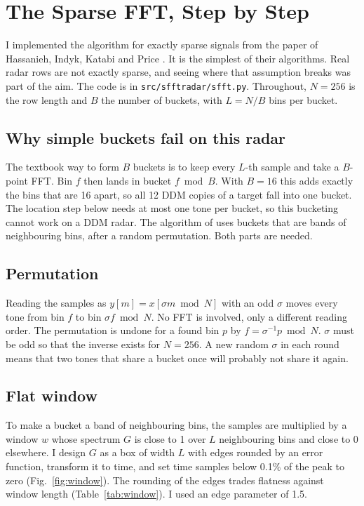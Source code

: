 \documentclass[10pt,a4paper]{article}
\begin{document}
\section{The Sparse FFT, Step by Step}
I implemented the algorithm for exactly sparse signals from the paper of Hassanieh, Indyk, Katabi and Price \cite{hassanieh2012nearly}. It is the simplest of their algorithms. Real radar rows are not exactly sparse, and seeing where that assumption breaks was part of the aim. The code is in \texttt{src/sfftradar/sfft.py}. Throughout, $N = 256$ is the row length and $B$ the number of buckets, with $L = N/B$ bins per bucket.

\subsection{Why simple buckets fail on this radar}
The textbook way to form $B$ buckets is to keep every $L$-th sample and take a $B$-point FFT. Bin $f$ then lands in bucket $f \bmod B$. With $B = 16$ this adds exactly the bins that are 16 apart, so all 12 DDM copies of a target fall into one bucket. The location step below needs at most one tone per bucket, so this bucketing cannot work on a DDM radar. The algorithm of \cite{hassanieh2012nearly} uses buckets that are bands of neighbouring bins, after a random permutation. Both parts are needed.

\subsection{Permutation}
Reading the samples as $y[m] = x[\sigma m \bmod N]$ with an odd $\sigma$ moves every tone from bin $f$ to bin $\sigma f \bmod N$. No FFT is involved, only a different reading order. The permutation is undone for a found bin $p$ by $f = \sigma^{-1} p \bmod N$. $\sigma$ must be odd so that the inverse exists for $N = 256$. A new random $\sigma$ in each round means that two tones that share a bucket once will probably not share it again.

\subsection{Flat window}
\label{sec:window}
To make a bucket a band of neighbouring bins, the samples are multiplied by a window $w$ whose spectrum $G$ is close to 1 over $L$ neighbouring bins and close to 0 elsewhere. I design $G$ as a box of width $L$ with edges rounded by an error function, transform it to time, and set time samples below 0.1\% of the peak to zero (Fig.~\ref{fig:window}). The rounding of the edges trades flatness against window length (Table~\ref{tab:window}). I used an edge parameter of 1.5.
\end{document}

